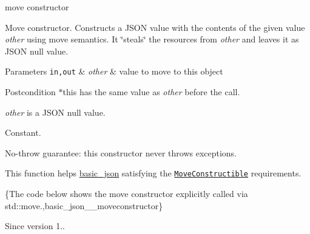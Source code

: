 move constructor 

Move constructor. Constructs a J\+S\+ON value with the contents of the given value {\itshape other} using move semantics. It \char`\"{}steals\char`\"{} the resources from {\itshape other} and leaves it as J\+S\+ON null value.


\begin{DoxyParams}[1]{Parameters}
\mbox{\tt in,out}  & {\em other} & value to move to this object\\
\hline
\end{DoxyParams}
\begin{DoxyPostcond}{Postcondition}
{\ttfamily $\ast$this} has the same value as {\itshape other} before the call. 

{\itshape other} is a J\+S\+ON null value.
\end{DoxyPostcond}
Constant.

No-\/throw guarantee\+: this constructor never throws exceptions.

This function helps {\ttfamily \mbox{\hyperlink{classnlohmann_1_1basic__json}{basic\+\_\+json}}} satisfying the \href{https://en.cppreference.com/w/cpp/named_req/MoveConstructible}{\tt Move\+Constructible} requirements.

\{The code below shows the move constructor explicitly called via std\+::move.,basic\+\_\+json\+\_\+\+\_\+moveconstructor\}

\begin{DoxySince}{Since}
version 1.. 
\end{DoxySince}
\mbox{\label{classnlohmann_1_1basic__json_aba01953d5d90e676d504863b8d9fdde5}} 
